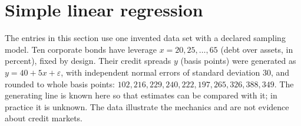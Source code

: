 \section{Simple linear regression}

The entries in this section use one invented data set with a declared sampling model. Ten corporate bonds have leverage $x=20, 25, \dots, 65$ (debt over assets, in percent), fixed by design. Their credit spreads $y$ (basis points) were generated as $y=40+5x+\varepsilon$, with independent normal errors of standard deviation 30, and rounded to whole basis points: $102, 216, 229, 240, 222, 197, 265, 326, 388, 349$. The generating line is known here so that estimates can be compared with it; in practice it is unknown. The data illustrate the mechanics and are not evidence about credit markets.

